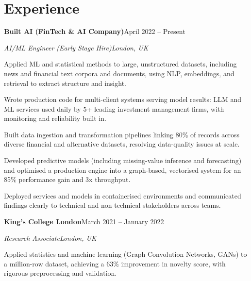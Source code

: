 \documentclass[10pt,a4paper]{article}
\newcommand{\entry}[4]{%
  {\color{company}\bfseries #1}\hfill {\color{muted}#2}\par
  \vspace{1pt}
  {\itshape #3}\hfill {\color{muted}\itshape #4}\par
  \vspace{3pt}%
}
\begin{document}
\section{Experience}
\entry{Built AI (FinTech \& AI Company)}{April 2022 -- Present}{AI/ML Engineer (Early Stage Hire)}{London, UK}
\begin{tight}
  \item Applied ML and statistical methods to large, unstructured datasets, including news and financial text corpora and documents, using NLP, embeddings, and retrieval to extract structure and insight.
  \item Wrote production code for multi-client systems serving model results: LLM and ML services used daily by 5+ leading investment management firms, with monitoring and reliability built in.
  \item Built data ingestion and transformation pipelines linking 80\% of records across diverse financial and alternative datasets, resolving data-quality issues at scale.
  \item Developed predictive models (including missing-value inference and forecasting) and optimised a production engine into a graph-based, vectorised system for an 85\% performance gain and 3x throughput.
  \item Deployed services and models in containerised environments and communicated findings clearly to technical and non-technical stakeholders across teams.
\end{tight}

\entry{King's College London}{March 2021 -- January 2022}{Research Associate}{London, UK}
\begin{tight}
  \item Applied statistics and machine learning (Graph Convolution Networks, GANs) to a million-row dataset, achieving a 63\% improvement in novelty score, with rigorous preprocessing and validation.
\end{tight}

\end{document}
